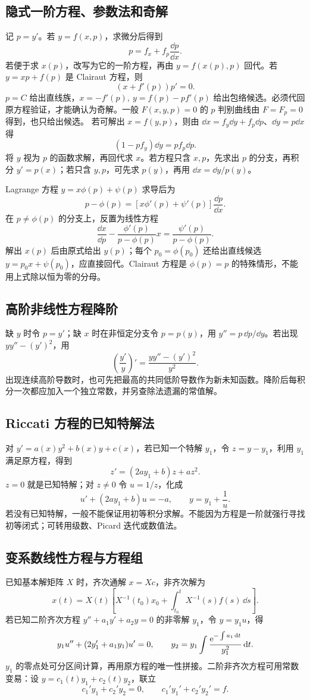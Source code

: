 \subsection{隐式一阶方程、参数法和奇解}
记 $p=y'$。若 $y=f(x,p)$，求微分后得到
\[
 p=f_x+f_p\dfrac{\dd p}{\dd x}.
\]
若便于求 $x(p)$，改写为它的一阶方程，再由 $y=f(x(p),p)$ 回代。若 $y=xp+f(p)$ 是 Clairaut 方程，则
\[
 (x+f'(p))p'=0.
\]
$p=C$ 给出直线族，$x=-f'(p),\ y=f(p)-pf'(p)$ 给出包络候选。必须代回原方程验证，才能确认为奇解。一般 $F(x,y,p)=0$ 的 $p$ 判别曲线由 $F=F_p=0$ 得到，也只给出候选。
若可解出 $x=f(y,p)$，则由 $\dd x=f_y\dd y+f_p\dd p$、$\dd y=p\dd x$ 得
\[
 (1-pf_y)\dd y=pf_p\dd p.
\]
将 $y$ 视为 $p$ 的函数求解，再回代求 $x$。若方程只含 $x,p$，先求出 $p$ 的分支，再积分 $y'=p(x)$；若只含 $y,p$，可先求 $p(y)$，再用 $\dd x=\dd y/p(y)$。

Lagrange 方程 $y=x\phi(p)+\psi(p)$ 求导后为
\[
 p-\phi(p)=[x\phi'(p)+\psi'(p)]\dfrac{\dd p}{\dd x}.
\]
在 $p\ne\phi(p)$ 的分支上，反置为线性方程
\[
 \dfrac{\dd x}{\dd p}-\dfrac{\phi'(p)}{p-\phi(p)}x
 =\dfrac{\psi'(p)}{p-\phi(p)}.
\]
解出 $x(p)$ 后由原式给出 $y(p)$；每个 $p_0=\phi(p_0)$ 还给出直线候选 $y=p_0x+\psi(p_0)$，应直接回代。Clairaut 方程是 $\phi(p)=p$ 的特殊情形，不能用上式除以恒为零的分母。
\subsection{高阶非线性方程降阶}
缺 $y$ 时令 $p=y'$；缺 $x$ 时在非恒定分支令 $p=p(y)$，用 $y''=p\,\dd p/\dd y$。若出现 $yy''-(y')^2$，用
\[
 \left(\dfrac{y'}y\right)'=\dfrac{yy''-(y')^2}{y^2}.
\]
出现连续高阶导数时，也可先把最高的共同低阶导数作为新未知函数。降阶后每积分一次都应加入一个独立常数，并另查除法遗漏的常值解。
\subsection{Riccati 方程的已知特解法}
对 $y'=a(x)y^2+b(x)y+c(x)$，若已知一个特解 $y_1$，令 $z=y-y_1$，利用 $y_1$ 满足原方程，得到
\[
 z'=(2ay_1+b)z+az^2.
\]
$z=0$ 就是已知特解；对 $z\ne0$ 令 $u=1/z$，化成
\[
 u'+(2ay_1+b)u=-a,\qquad y=y_1+\dfrac1u.
\]
若没有已知特解，一般不能保证用初等积分求解。不能因为方程是一阶就强行寻找初等闭式；可转用级数、Picard 迭代或数值法。
\subsection{变系数线性方程与方程组}
已知基本解矩阵 $X$ 时，齐次通解 $x=Xc$，非齐次解为
\[
 x(t)=X(t)\left[X^{-1}(t_0)x_0+\int_{t_0}^tX^{-1}(s)f(s)\,\dd s\right].
\]
若已知二阶齐次方程 $y''+a_1y'+a_2y=0$ 的非零解 $y_1$，令 $y=y_1u$，得
\[
 y_1u''+(2y_1'+a_1y_1)u'=0,
 \qquad y_2=y_1\int\dfrac{\mathrm e^{-\int a_1\,\mathrm d t}}{y_1^2}\,\mathrm d t.
\]
$y_1$ 的零点处可分区间计算，再用原方程的唯一性拼接。二阶非齐次方程可用常数变易：设 $y=c_1(t)y_1+c_2(t)y_2$，联立
\[
 c_1'y_1+c_2'y_2=0,\qquad c_1'y_1'+c_2'y_2'=f.
\]
